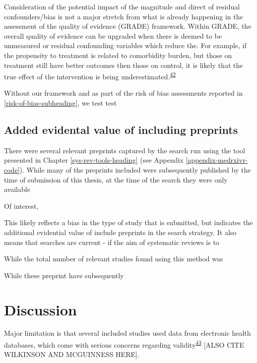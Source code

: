 \documentclass[a4paper, twoside]{templates/ociamthesis}
\begin{document}
Consideration of the potential impact of the magnitude and direct of residual confounders/bias is not a major stretch from what is already happening in the assessment of the quality of evidence (GRADE) framework. Within GRADE, the overall quality of evidence can be upgraded when there is deemed to be unmeasured or residual confounding variables which reduce the. For example, if the propensity to treatment is related to comorbidity burden, but those on treatment still have better outcomes then those on control, it is likely that the true effect of the intervention is being underestimated.\textsuperscript{\protect\hyperlink{ref-guyatt2011}{42}}

Without our framework and as part of the risk of bias assessments reported in \ref{risk-of-bias-subheading}, we test test

\hypertarget{added-evidental-value-of-including-preprints}{%
\subsection{Added evidental value of including preprints}\label{added-evidental-value-of-including-preprints}}

There were several relevant preprints captured by the search run using the tool presented in Chapter \ref{sys-rev-tools-heading} (see Appendix \ref{appendix-medrxivr-code}). While many of the preprints included were subsequently published by the time of submission of this thesis, at the time of the search they were only available

Of interest,

This likely reflects a bias in the type of study that is submitted, but indicates the additional evidential value of include preprints in the search strategy. It also means that searches are current - if the aim of systematic reviews is to

While the total number of relevant studies found using this method was

While these preprint have subsequently

\hypertarget{discussion-1}{%
\section{Discussion}\label{discussion-1}}

Major limitation is that several included studies used data from electronic health databases, which come with serious concerns regarding validity\textsuperscript{\protect\hyperlink{ref-hsieh2019}{43}} {[}ALSO CITE WILKINSON AND MCGUINNESS HERE{]}.
\end{document}
